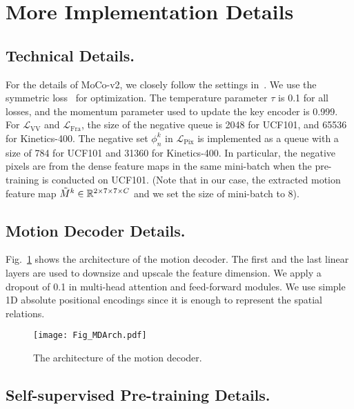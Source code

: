 \documentclass[sigconf,screen]{acmart}
\begin{document}
\appendix
\clearpage
\section{More Implementation Details}

\subsection{Technical Details.}

For the details of MoCo-v2, we closely follow the settings in~\cite{MoCov2}. We use the symmetric loss~\cite{BYOL} for optimization. The temperature parameter $\tau$ is 0.1 for all losses, and the momentum parameter used to update the key encoder is 0.999. For $\mathcal{L}_{\mathrm{VV}}$ and $\mathcal{L}_{\mathrm{Fra}}$, the size of the negative queue is 2048 for UCF101, and 65536 for Kinetics-400. The negative set $\phi_n^k$ in $\mathcal{L}_{\mathrm{Pix}}$ is implemented as a queue with a size of 784 for UCF101 and 31360 for Kinetics-400. In particular, the negative pixels are from the dense feature maps in the same mini-batch when the pre-training is conducted on UCF101. (Note that in our case, the extracted motion feature map $\Tilde{M}^k \in \mathbb{R}^{2 \times 7 \times 7 \times C}$ and we set the size of mini-batch to 8).

\subsection{Motion Decoder Details.}

Fig.~\ref{MDArch} shows the architecture of the motion decoder. The first and the last linear layers are used to downsize and upscale the feature dimension. We apply a dropout of 0.1 in multi-head attention and feed-forward modules. We use simple 1D absolute positional encodings since it is enough to represent the spatial relations.

\begin{figure}[htbp]
\begin{center}
\texttt{[image: Fig\_MDArch.pdf]}
\end{center}
   \caption{The architecture of the motion decoder. }
\label{MDArch}
\end{figure}

\subsection{Self-supervised Pre-training Details.} 
\end{document}
